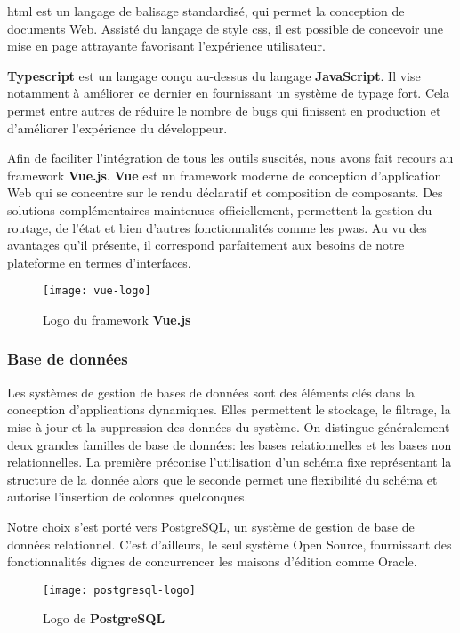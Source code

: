 \acrshort{html} est un langage de balisage standardisé, qui permet la conception de documents Web. 
Assisté du langage de style \acrshort{css}, il est possible de concevoir une mise en page attrayante favorisant l'expérience utilisateur.

\textbf{Typescript} est un langage conçu au-dessus du langage \textbf{JavaScript}. 
Il vise notamment à améliorer ce dernier en fournissant un système de typage fort. 
Cela permet entre autres de réduire le nombre de bugs qui finissent en production et d'améliorer l'expérience du développeur.

Afin de faciliter l'intégration de tous les outils suscités, nous avons fait recours au framework \textbf{Vue.js}. 
\textbf{Vue} est un framework moderne de conception d’application Web qui se concentre sur le rendu déclaratif et composition de composants. 
Des solutions complémentaires maintenues officiellement, permettent la gestion du routage, de l'état et bien d’autres fonctionnalités comme les \acrshort{pwa}s. 
Au vu des avantages qu’il présente, il correspond parfaitement aux besoins de notre plateforme en termes d’interfaces.

\begin{figure}[h]
  \centering
  \texttt{[image: vue-logo]}
  \caption{Logo du framework \textbf{Vue.js}}
  \label{fig:vue_logo}
\end{figure}


\subsubsection{Base de données}
Les systèmes de gestion de bases de données sont des éléments clés dans la conception d’applications dynamiques. 
Elles permettent le stockage, le filtrage, la mise à jour et la suppression des données du système. 
On distingue généralement deux grandes familles de base de données: les bases relationnelles et les bases non relationnelles. 
La première préconise l’utilisation d’un schéma fixe représentant la structure de la donnée alors que le seconde permet une flexibilité du schéma et autorise l’insertion de colonnes quelconques.

Notre choix s’est porté vers PostgreSQL, un système de gestion de base de données relationnel. 
C’est d’ailleurs, le seul système Open Source, fournissant des fonctionnalités dignes de concurrencer les maisons d'édition comme Oracle.

\begin{figure}[h]
  \centering
  \texttt{[image: postgresql-logo]}
  \caption{Logo de \textbf{PostgreSQL}}
  \label{fig:pg_logo}
\end{figure}

